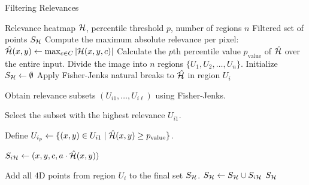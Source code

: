 \begin{algorithm}[ht]
\caption{Filtering Relevances}
\begin{algorithmic}[1]
\Require Relevance heatmap \( \mathcal{H} \), percentile threshold \( p \), number of regions \( n \)
\Ensure Filtered set of points \( S_{\mathcal{H}} \)
    \State Compute the maximum absolute relevance per pixel:
        \State \( \hat{\mathcal{H}}(x, y) \gets \max_{c \in C} |\mathcal{H}(x, y, c)| \)
    \EndFor
    \State Calculate the \( p \)th percentile value \( p_{\text{value}} \) of \( \hat{\mathcal{H}} \) over the entire input.
    \State Divide the image into \( n \) regions \( \{ U_1, U_2, \dots, U_n \} \).
    \State Initialize \( S_{\mathcal{H}} \gets \emptyset \)
        \State Apply Fisher-Jenks natural breaks to \( \hat{\mathcal{H}} \) in region \( U_i \)
        
        \State Obtain relevance subsets \( (U_{i1}, \dots, U_{i\ell}) \) using Fisher-Jenks.
        
        \State Select the subset with the highest relevance \( U_{i1} \).
        
        \State Define \( U_{i_p} \gets \{ (x, y) \in U_{i1} \mid \hat{\mathcal{H}}(x, y) \geq p_{\text{value}} \} \).
        
            \State \( S_{i\mathcal{H}} \gets (x, y, c, a \cdot \hat{\mathcal{H}}(x, y)) \)
        \EndFor
        
        \State Add all 4D points from region \( U_i \) to the final set \( S_{\mathcal{H}} \).
        \State \( S_{\mathcal{H}} \gets S_{\mathcal{H}} \cup S_{i\mathcal{H}} \)
    \EndFor
    \State \Return \( S_{\mathcal{H}} \)
\EndProcedure
\end{algorithmic}
\end{algorithm}

